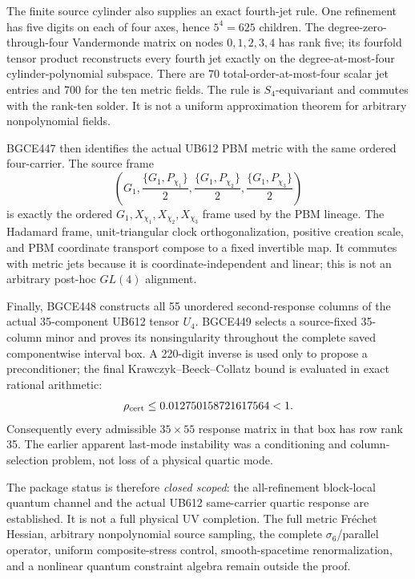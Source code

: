 \documentclass[11pt]{article}
\theoremstyle{definition}
\theoremstyle{remark}
\begin{document}
The finite source cylinder also supplies an exact fourth-jet rule. One refinement has five digits on each of four axes, hence $5^4=625$ children. The degree-zero-through-four Vandermonde matrix on nodes $0,1,2,3,4$ has rank five; its fourfold tensor product reconstructs every fourth jet exactly on the degree-at-most-four cylinder-polynomial subspace. There are 70 total-order-at-most-four scalar jet entries and 700 for the ten metric fields. The rule is $S_4$-equivariant and commutes with the rank-ten solder. It is not a uniform approximation theorem for arbitrary nonpolynomial fields.

BGCE447 then identifies the actual UB612 PBM metric with the same ordered four-carrier. The source frame
\begin{equation}
 \left(G_1,\frac{\{G_1,P_{\chi_1}\}}2,
 \frac{\{G_1,P_{\chi_2}\}}2,
 \frac{\{G_1,P_{\chi_3}\}}2\right)
\end{equation}
is exactly the ordered $G_1,X_{\chi_1},X_{\chi_2},X_{\chi_3}$ frame used by the PBM lineage. The Hadamard frame, unit-triangular clock orthogonalization, positive creation scale, and PBM coordinate transport compose to a fixed invertible map. It commutes with metric jets because it is coordinate-independent and linear; this is not an arbitrary post-hoc $GL(4)$ alignment.

Finally, BGCE448 constructs all 55 unordered second-response columns of the actual 35-component UB612 tensor $U_4$. BGCE449 selects a source-fixed 35-column minor and proves its nonsingularity throughout the complete saved componentwise interval box. A 220-digit inverse is used only to propose a preconditioner; the final Krawczyk--Beeck--Collatz bound is evaluated in exact rational arithmetic:
\begin{equation}
 \rho_{\rm cert}\le 0.012750158721617564<1.
\end{equation}
Consequently every admissible $35\times55$ response matrix in that box has row rank 35. The earlier apparent last-mode instability was a conditioning and column-selection problem, not loss of a physical quartic mode.

The package status is therefore \emph{closed scoped}: the all-refinement block-local quantum channel and the actual UB612 same-carrier quartic response are established. It is not a full physical UV completion. The full metric Fr\'echet Hessian, arbitrary nonpolynomial source sampling, the complete $\sigma_6$/parallel operator, uniform composite-stress control, smooth-spacetime renormalization, and a nonlinear quantum constraint algebra remain outside the proof.
\end{document}

